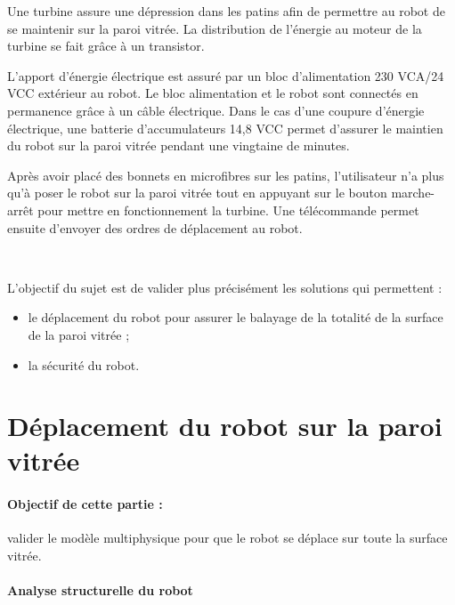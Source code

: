 Une turbine assure une dépression dans les patins afin de permettre au robot de se
maintenir sur la paroi vitrée. La distribution de l'énergie au moteur de la turbine se fait grâce à un transistor.

L'apport d'énergie électrique est assuré par un bloc d'alimentation 230 VCA/24 VCC
extérieur au robot. Le bloc alimentation et le robot sont connectés en permanence grâce à un câble électrique. Dans le cas d'une coupure d'énergie électrique, une batterie
d'accumulateurs 14,8 VCC permet d'assurer le maintien du robot sur la paroi vitrée
pendant une vingtaine de minutes.

Après avoir placé des bonnets en microfibres sur les patins, l'utilisateur n'a plus qu'à
poser le robot sur la paroi vitrée tout en appuyant sur le bouton marche-arrêt pour mettre en fonctionnement la turbine. Une télécommande permet ensuite d'envoyer des ordres de déplacement au robot.

~\

L'objectif du sujet est de valider plus précisément les solutions qui permettent :
\begin{itemize}
 \item le déplacement du robot pour assurer le balayage de la totalité de la surface de la paroi vitrée ;
 \item la sécurité du robot.
\end{itemize}

\section{Déplacement du robot sur la paroi vitrée}

\paragraph{Objectif de cette partie :} valider le modèle multiphysique pour que le robot se déplace sur toute la surface vitrée.

\paragraph{Analyse structurelle du robot} ~\ \\


